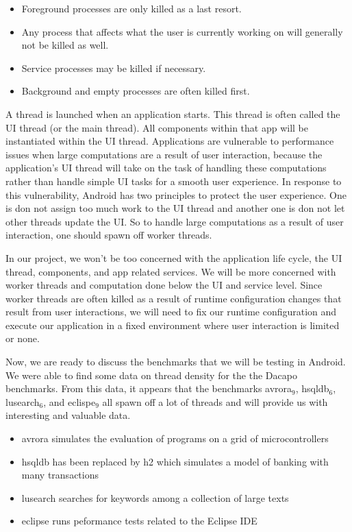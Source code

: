 \documentclass[11pt]{article}
\begin{document}
\begin{itemize}
\item Foreground processes are only killed as a last resort.
\item Any process that affects what the user is currently working on will generally not be killed as well.
\item Service processes may be killed if necessary.
\item Background and empty processes are often killed first.
\end{itemize}

A thread is launched when an application starts.  This thread is often called the UI thread (or the main thread).  All components within that app will be instantiated within the UI thread.  Applications are vulnerable to performance issues when large computations are a result of user interaction, because the application’s UI thread will take on the task of handling these computations rather than handle simple UI tasks for a smooth user experience.  In response to this vulnerability, Android has two principles to protect the user experience.  One is don not assign too much work to the UI thread and another one is don not let other threads update the UI.  So to handle large computations as a result of user interaction, one should spawn off worker threads.

In our project, we won’t be too concerned with the application life cycle, the UI thread, components, and app related services.  We will be more concerned with worker threads and computation done below the UI and service level.  Since worker threads are often killed as a result of runtime configuration changes that result from user interactions, we will need to fix our runtime configuration and execute our application in a fixed environment where user interaction is limited or none.

Now, we are ready to discuss the benchmarks that we will be testing in Android.  We were able to find some data on thread density for the the Dacapo benchmarks.  From this data, it appears that the benchmarks avrora$_{\text{9}}$, hsqldb$_{\text{6}}$, lusearch$_{\text{6}}$, and eclispe$_{\text{9}}$ all spawn off a lot of threads and will provide us with interesting and valuable data.

\begin{itemize}
\item avrora simulates the evaluation of programs on a grid of microcontrollers
\item hsqldb has been replaced by h2 which simulates a model of banking with many transactions
\item lusearch searches for keywords among a collection of large texts
\item eclipse runs peformance tests related to the Eclipse IDE
\end{itemize}
\end{document}
